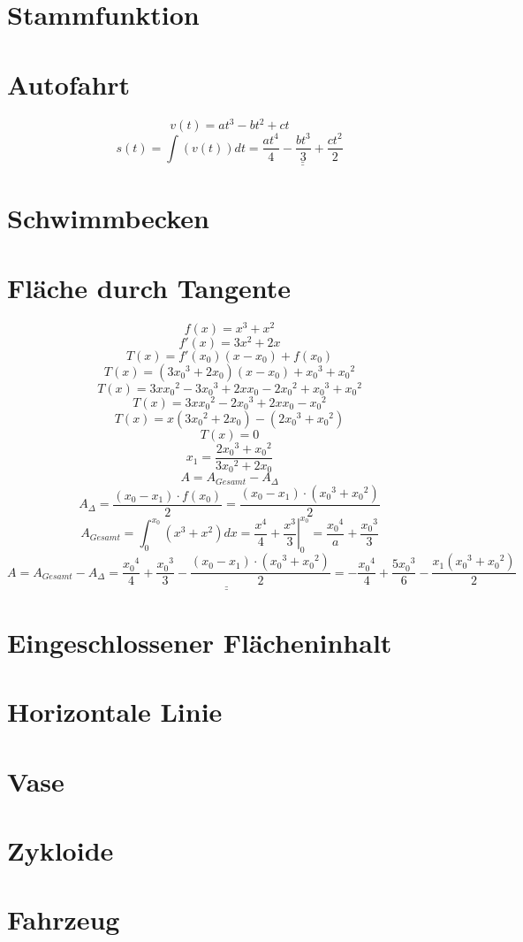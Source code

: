 \section{Stammfunktion}

\section{Autofahrt}
\[ v(t) = a t^3 - b t^2 + c t \]
\[ s(t) = \int (v(t)) dt = \underline{\underline{\frac{a t^4}{4} - \frac{b t^3}{3} + \frac{c t^2}{2}}} \]

\section{Schwimmbecken}

\section{Fläche durch Tangente}
\[ f(x) = x^3 + x^2 \]
\[ f'(x) = 3 x^2 + 2 x \]
\[ T(x) = f'(x_0)(x - x_0) + f(x_0) \]
\[ T(x) = (3 {x_0}^3 + 2 x_0)(x-x_0) + {x_0}^3 + {x_0}^2 \]
\[ T(x) = 3 x {x_0}^2 - 3 {x_0}^3 + 2 x x_0 - 2 {x_0}^2 + {x_0}^3 + {x_0}^2 \]
\[ T(x) = 3 x {x_0}^2 - 2 {x_0}^3 + 2 x x_0 - {x_0}^2 \]
\[ T(x) = x(3 {x_0}^2 + 2 x_0) - (2 {x_0}^3 + {x_0}^2) \]
\[ T(x) = 0 \]
\[ x_1 = \frac{2 {x_0}^3 + {x_0}^2}{3 {x_0}^2 + 2 x_0} \]
\[ A = A_{Gesamt} - A_\Delta \]
\[ A_\Delta = \frac{(x_0 - x_1) \cdot f(x_0)}{2} = \frac{(x_0 - x_1) \cdot ({x_0}^3 + {x_0}^2)}{2} \]
\[ A_{Gesamt} = \int_0^{x_0} (x^3 + x^2) dx = \left.\frac{x^4}{4} + \frac{x^3}{3} \right|_{0}^{x_0} = \frac{{x_0}^4}{a} + \frac{{x_0}^3}{3} \]
\[ A = A_{Gesamt} - A_\Delta = \underline{\underline{\frac{{x_0}^4}{4} + \frac{{x_0}^3}{3} - \frac{(x_0 - x_1) \cdot ({x_0}^3 + {x_0}^2)}{2}}} = -\frac{{x_0}^4}{4} + \frac{5 {x_0}^3}{6} - \frac{x_1 ({x_0}^3 + {x_0}^2)}{2} \]
\[  \]
\[  \]
\[  \]
\[  \]
\[  \]


\section{Eingeschlossener Flächeninhalt}

\section{Horizontale Linie}

\section{Vase}

\section{Zykloide}

\section{Fahrzeug}
